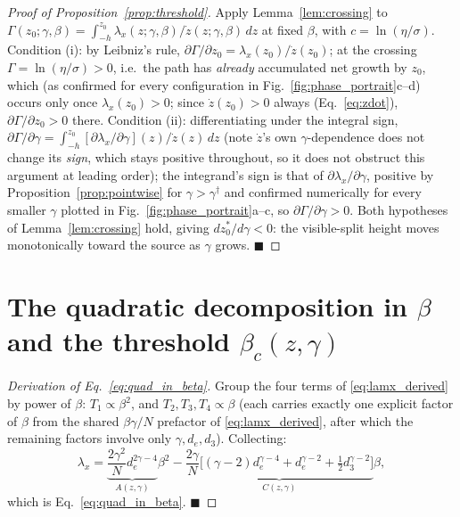 \documentclass[11pt,a4paper]{article}
\theoremstyle{plain}
\theoremstyle{definition}
\theoremstyle{remark}
\newcommand{\lam}{\lambda}
\newcommand{\bw}{\beta}
\newcommand{\bwc}{\beta_c}
\newcommand{\de}{d_e}
\newcommand{\dth}{d_3}
\begin{document}
\begin{proof}[Proof of Proposition~\ref{prop:threshold}]
Apply Lemma~\ref{lem:crossing} to $\Gamma(z_0;\gamma,\bw)=\int_{-h}^{z_0}
\lam_x(z;\gamma,\bw)/\dot z(z;\gamma,\bw)\,dz$ at fixed $\bw$, with
$c=\ln(\eta/\sigma)$. Condition (i): by Leibniz's rule,
$\partial\Gamma/\partial z_0=\lam_x(z_0)/\dot z(z_0)$; at the crossing
$\Gamma=\ln(\eta/\sigma)>0$, i.e.\ the path has \emph{already} accumulated
net growth by $z_0$, which (as confirmed for every configuration in
Fig.~\ref{fig:phase_portrait}c--d) occurs only once $\lam_x(z_0)>0$; since
$\dot z(z_0)>0$ always (Eq.~\eqref{eq:zdot}), $\partial\Gamma/\partial
z_0>0$ there. Condition (ii): differentiating under the integral sign,
$\partial\Gamma/\partial\gamma=\int_{-h}^{z_0}[\partial\lam_x/\partial\gamma](z)/\dot
z(z)\,dz$ (note $\dot z$'s own $\gamma$-dependence does not change its
\emph{sign}, which stays positive throughout, so it does not obstruct this
argument at leading order); the integrand's sign is that of
$\partial\lam_x/\partial\gamma$, positive by Proposition~\ref{prop:pointwise}
for $\gamma>\gamma^\dagger$ and confirmed numerically for every smaller
$\gamma$ plotted in Fig.~\ref{fig:phase_portrait}a--c, so
$\partial\Gamma/\partial\gamma>0$. Both hypotheses of
Lemma~\ref{lem:crossing} hold, giving $dz_0^*/d\gamma<0$: the visible-split
height moves monotonically toward the source as $\gamma$ grows.
$\blacksquare$
\end{proof}

\section{The quadratic decomposition in $\bw$ and the threshold $\bwc(z,\gamma)$}
\label{app:quadratic}

\begin{proof}[Derivation of Eq.~\eqref{eq:quad_in_beta}]
Group the four terms of \eqref{eq:lamx_derived} by power of $\bw$: $T_1\propto\bw^2$,
and $T_2,T_3,T_4\propto\bw$ (each carries exactly one explicit factor of
$\bw$ from the shared $\bw\gamma/N$ prefactor of \eqref{eq:lamx_derived},
after which the remaining factors involve only $\gamma,\de,\dth$).
Collecting:
\[
\lam_x=\underbrace{\frac{2\gamma^2}{N}\de^{2\gamma-4}}_{A(z,\gamma)}\bw^2
-\underbrace{\frac{2\gamma}{N}\Big[(\gamma-2)\de^{\gamma-4}+\de^{\gamma-2}+\tfrac12\dth^{\gamma-2}\Big]}_{C(z,\gamma)}\bw,
\]
which is Eq.~\eqref{eq:quad_in_beta}. $\blacksquare$
\end{proof}
\end{document}

